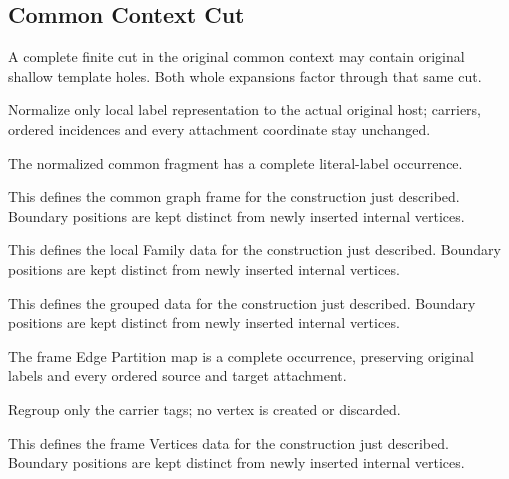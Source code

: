 \subsection{Common Context Cut}
A complete finite cut in the original common context may contain original shallow template holes. Both whole expansions factor through that same cut.

Normalize only local label representation to the actual original host; carriers, ordered incidences and every attachment coordinate stay unchanged.
\par{}

The normalized common fragment has a complete literal-label occurrence.
\par{}

This defines the common graph frame for the construction just described. Boundary positions are kept distinct from newly inserted internal vertices.
\par{}

This defines the local Family data for the construction just described. Boundary positions are kept distinct from newly inserted internal vertices.
\par{}

This defines the grouped data for the construction just described. Boundary positions are kept distinct from newly inserted internal vertices.
\par{}

The frame Edge Partition map is a complete occurrence, preserving original labels and every ordered source and target attachment.
\par{}

Regroup only the carrier tags; no vertex is created or discarded.
\par{}

This defines the frame Vertices data for the construction just described. Boundary positions are kept distinct from newly inserted internal vertices.
\par{}

